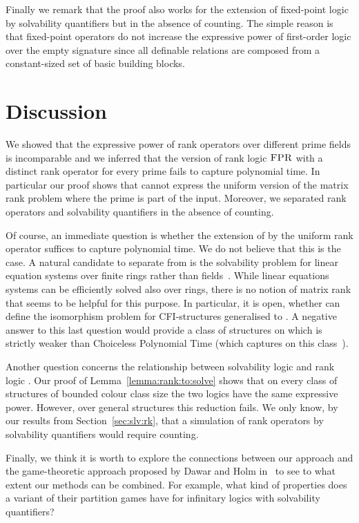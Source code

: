 \documentclass[a4paper,UKenglish]{lipics}
\newcommand{\logic}[1]{\ensuremath{\textsc{#1}}\xspace}
\newcommand{\FPRK}{\logic{FPR}}
\newcommand{\FPR}{\FPRK}
\theoremstyle{plain}
\begin{document}
Finally we remark that the proof also works for the extension of 
fixed-point logic by solvability quantifiers but in the absence of counting.
The simple reason is that fixed-point operators do not increase the expressive 
power of first-order logic over the empty signature since all definable 
relations are composed from a constant-sized set of basic building blocks. 


\section{Discussion}

We showed that the expressive power of rank operators over 
different prime fields is incomparable and we inferred that the version of rank 
logic \FPR with a distinct rank operator  for every prime  
fails to capture polynomial time.
In particular our proof shows that  cannot express the uniform version of 
the matrix rank problem where the prime  is part of the input.
Moreover, we separated rank operators and solvability quantifiers in the 
absence of counting.

Of course, an immediate question is whether the extension  of 
 by the uniform rank operator  suffices to capture polynomial time.
We do not believe that this is the case.
A natural candidate to separate  from  is the solvability 
problem for linear equation systems over finite rings
rather than fields~\cite{DaGrHoKoPa13}.
While linear equations systems can be efficiently solved also over rings,
there is no notion of matrix rank that seems to be helpful for this purpose.
In particular, it is open, whether  can
define the isomorphism problem for CFI-structures 
generalised to .
A negative answer to this last question would provide a class 
of structures on which  is strictly weaker than
Choiceless Polynomial Time (which captures  on this 
class~\cite{AGGP14}).

Another question concerns the relationship between solvability 
logic  and rank logic . Our proof of 
Lemma~\ref{lemma:rank:to:solve} shows that on every class of structures of 
bounded colour class size the two logics have the same expressive power.
However, over general structures this reduction fails.
We only know, by our results from Section~\ref{sec:slv:rk}, that
a simulation of rank operators by solvability quantifiers would require
counting.

Finally, we think it is worth to explore the connections between our approach 
and the game-theoretic approach proposed by Dawar and Holm in~\cite{DaHo12} to 
see to what extent our methods can be combined. 
For example, what kind of properties does a variant of their partition games 
have for  infinitary logics with solvability quantifiers?




\end{document}
